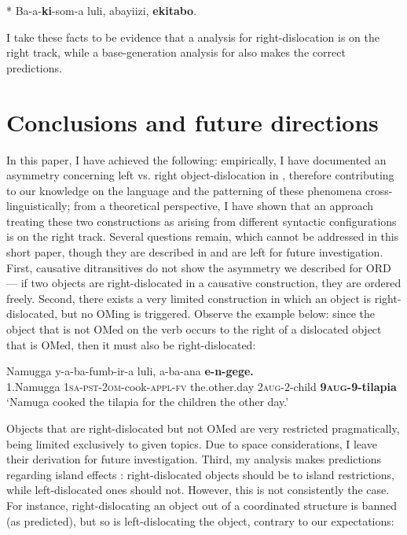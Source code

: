 \documentclass[output=paper,newtxmath,modfonts,nonflat,hidelinks]{langsci/langscibook}
\begin{document}
\ex\label{ex:ranero:41b}
* Ba-a-\textbf{ki}{}-som-a  luli,   abayiizi,   \textbf{ekitabo}.
\z
\z

{I take these facts to be evidence that a  analysis for right-dislocation is on the right track, while a base-generation analysis for  also makes the correct predictions.}


\section{Conclusions and future directions}\label{sec:ranero:6}

{In this paper, I have achieved the following: empirically, I have documented an asymmetry concerning left vs. right object-dislocation in , therefore contributing to our knowledge on the language and the patterning of these phenomena cross-linguistically; from a theoretical perspective, I have shown that an approach treating these two constructions as arising from different syntactic configurations is on the right track. Several questions remain, which cannot be addressed in this short paper, though they are described in \citet{ranero2015} and are left for future investigation. First, causative ditransitives do not show the asymmetry we described for ORD — if two objects are right-dislocated in a causative construction, they are ordered freely. Second, there exists a very limited construction in which an object is right-dislocated, but no OMing is triggered. Observe the example below: since the object that is not OMed on the verb occurs to the right of a dislocated object that is OMed, then it must also be right-dislocated:}


\ea\label{ex:ranero:42}
\gll Namugga    y-a-ba{}-fumb-ir-a           luli,             a-ba-ana         \textbf{e-n-gege.}\\
1.Namugga \textsc{1sa-pst-2om}{}-cook-\textsc{appl-fv} the.other.day \textsc{2aug-}2-child \textbf{\textsc{9aug-}}\textbf{9-tilapia}\\
\glt ‘Namuga cooked the tilapia for the children the other day.’
\z

Objects that are right-dislocated but not OMed are very restricted pragmatically, being limited exclusively to given topics. Due to space considerations, I leave their derivation for future investigation. Third, my analysis makes predictions regarding island effects \citep{Boeckx2012}: right-dislocated objects should be  to island restrictions, while left-dislocated ones should not. However, this is not consistently the case. For instance, right-dislocating an object out of a coordinated structure is banned (as predicted), but so is left-dislocating the object, contrary to our expectations:
\end{document}
